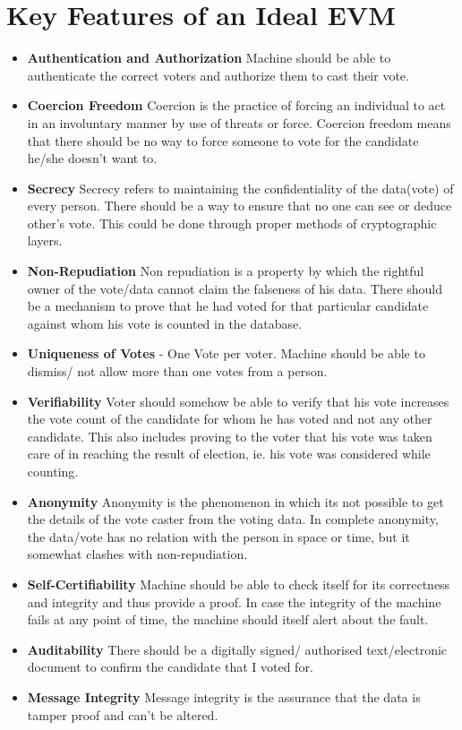 \documentclass[11pt]{article}
\begin{document}
    \section{Key Features of an Ideal EVM}
    
    
    \begin{itemize}
    \item \textbf{Authentication and Authorization} Machine should be able to authenticate the correct voters and authorize them to cast their vote.
    \item \textbf{Coercion Freedom} Coercion is the practice of forcing an individual to act in an involuntary manner by use of threats or force. Coercion freedom means that there should be no way to force someone to vote for the candidate he/she doesn't want to.
    \item \textbf{Secrecy} Secrecy refers to maintaining the confidentiality of the data(vote) of every person. There should be a way to ensure that no one can see or deduce other's vote. This could be done through proper methods of cryptographic layers.
    \item \textbf{Non-Repudiation} Non repudiation is a property by which the rightful owner of the vote/data cannot claim the falseness of his data. There should be a mechanism to prove that he had voted for that particular candidate against whom his vote is counted in the database.
    \item \textbf{Uniqueness of Votes} - One Vote per voter. Machine should be able to dismiss/ not allow more than one votes from a person.
    \item \textbf{Verifiability} Voter should somehow be able to verify that his vote increases the vote count of the candidate for whom he has voted and not any other candidate. This also includes proving to the voter that his vote was taken care of in reaching the result of election, ie. his vote was considered while counting.
    \item \textbf{Anonymity} Anonymity is the phenomenon in which its not possible to get the details of the vote caster from the voting data. In complete anonymity, the data/vote has no relation with the person in space or time, but it somewhat clashes with non-repudiation.
    \item \textbf{Self-Certifiability} Machine should be able to check itself for its correctness and integrity and thus provide a proof. In case the integrity of the machine fails at any point of time, the machine should itself alert about the fault.
    \item \textbf{Auditability} There should be a digitally signed/ authorised text/electronic document to confirm the candidate that I voted for. 
    \item \textbf{Message Integrity} Message integrity is the assurance that the data is tamper proof and can't be altered.
    
    \end{itemize}
\end{document}
